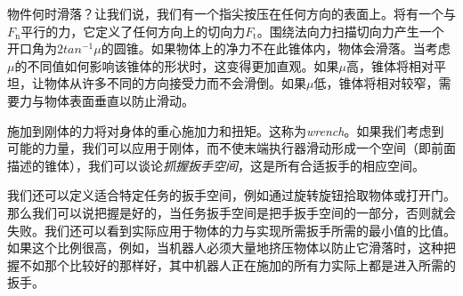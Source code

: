 


物件何时滑落？让我们说，我们有一个指尖按压在任何方向的表面上。将有一个与$F_\mathrm{n}$平行的力，它定义了任何方向上的切向力$F_\mathrm{t}$。围绕法向力扫描切向力产生一个开口角为$2tan^{-1}\mu$的圆锥。如果物体上的净力不在此锥体内，物体会滑落。当考虑$\mu$的不同值如何影响该锥体的形状时，这变得更加直观。如果$\mu$高，锥体将相对平坦，让物体从许多不同的方向接受力而不会滑倒。如果$\mu$低，锥体将相对较窄，需要力与物体表面垂直以防止滑动。


施加到刚体的力将对身体的重心施加力和扭矩。这称为\emph{wrench}。如果我们考虑到可能的力量，我们可以应用于刚体，而不使末端执行器滑动形成一个空间（即前面描述的锥体），我们可以谈论\emph{抓握扳手空间}，这是所有合适扳手的相应空间。

我们还可以定义适合特定任务的扳手空间，例如通过旋转旋钮拾取物体或打开门。那么我们可以说把握是好的，当任务扳手空间是把手扳手空间的一部分，否则就会失败。我们还可以看到实际应用于物体的力与实现所需扳手所需的最小值的比值。如果这个比例很高，例如，当机器人必须大量地挤压物体以防止它滑落时，这种把握不如那个比较好的那样好，其中机器人正在施加的所有力实际上都是进入所需的扳手。

